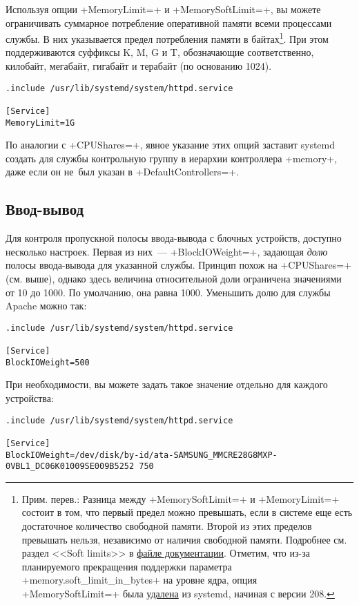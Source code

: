 \documentclass[10pt,oneside,a4paper]{article}
\begin{document}
Используя опции +MemoryLimit=+ и +MemorySoftLimit=+, вы можете ограничивать
суммарное потребление оперативной памяти всеми процессами службы.  В них
указывается предел потребления памяти в байтах\footnote{Прим. перев.: Разница
между +MemorySoftLimit=+ и +MemoryLimit=+ состоит в том, что первый предел можно
превышать, если в системе еще есть достаточное количество свободной памяти.
Второй из этих пределов превышать нельзя, независимо от наличия свободной
памяти. Подробнее см. раздел <<Soft limits>> в
\href{http://www.kernel.org/doc/Documentation/cgroups/memory.txt}{файле
документации}. Отметим, что из-за планируемого прекращения поддержки параметра
+memory.soft_limit_in_bytes+ на уровне ядра, опция +MemorySoftLimit=+ была
\href{http://cgit.freedesktop.org/systemd/systemd/commit/?id=ddca82aca08712a302cfabdbe59f73ee9ed3f73a}%
{удалена} из systemd, начиная с версии 208.}. При этом поддерживаются суффиксы
K, M, G и T, обозначающие соответственно, килобайт, мегабайт, гигабайт и
терабайт (по основанию 1024).
\begin{Verbatim}
.include /usr/lib/systemd/system/httpd.service

[Service]
MemoryLimit=1G
\end{Verbatim}

По аналогии с +CPUShares=+, явное указание этих опций заставит systemd создать
для службы контрольную группу в иерархии контроллера +memory+, даже если он
не~был указан в +DefaultControllers=+.

\subsection{Ввод-вывод}

Для контроля пропускной полосы ввода-вывода с блочных устройств, доступно
несколько настроек. Первая из них~--- +BlockIOWeight=+, задающая \emph{долю} полосы
ввода-вывода для указанной службы. Принцип похож на +CPUShares=+ (см. выше), однако
здесь величина относительной доли ограничена значениями от 10 до 1000. По
умолчанию, она равна 1000. Уменьшить долю для службы Apache можно так:
\begin{Verbatim}
.include /usr/lib/systemd/system/httpd.service

[Service]
BlockIOWeight=500
\end{Verbatim}

При необходимости, вы можете задать такое значение отдельно для каждого
устройства:
\begin{Verbatim}
.include /usr/lib/systemd/system/httpd.service

[Service]
BlockIOWeight=/dev/disk/by-id/ata-SAMSUNG_MMCRE28G8MXP-0VBL1_DC06K01009SE009B5252 750
\end{Verbatim}
\end{document}
